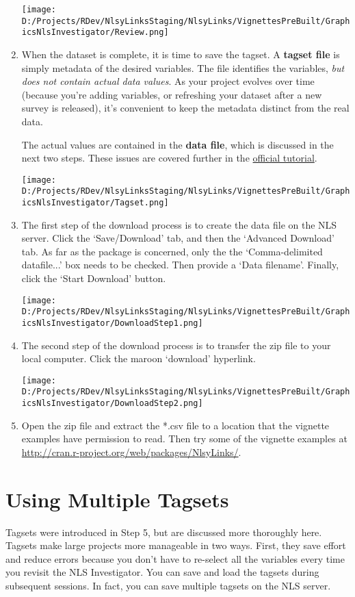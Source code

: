 \documentclass{article}\usepackage[]{graphicx}\usepackage[]{color}
\begin{document}
\begin{enumerate}
\texttt{[image: D:/Projects/RDev/NlsyLinksStaging/NlsyLinks/VignettesPreBuilt/GraphicsNlsInvestigator/Review.png]}

\item When the dataset is complete, it is time to save the tagset.  A \textbf{tagset file} is simply metadata of the desired variables.  The file identifies the variables, \emph{but does not contain actual data values}.  As your project evolves over time (because you're adding variables, or refreshing your dataset after a new survey is released), it's convenient to keep the metadata distinct from the real data.  

The actual values are contained in the \textbf{data file}, which is discussed in the next two steps.  These issues are covered further in the \href{http://www.nlsinfo.org/InvestigatorGuide/investigator_guide_TOC.html}{official tutorial}.

\texttt{[image: D:/Projects/RDev/NlsyLinksStaging/NlsyLinks/VignettesPreBuilt/GraphicsNlsInvestigator/Tagset.png]}

\item The first step of the download process is to create the data file on the NLS server.  Click the `Save/Download' tab, and then the `Advanced Download' tab.  As far as the  package is concerned, only the the `Comma-delimited datafile...' box needs to be checked.  Then provide a `Data filename'.  Finally, click the `Start Download' button.

\texttt{[image: D:/Projects/RDev/NlsyLinksStaging/NlsyLinks/VignettesPreBuilt/GraphicsNlsInvestigator/DownloadStep1.png]}

\item The second step of the download process is to transfer the zip file to your local computer.  Click the maroon `download' hyperlink.

\texttt{[image: D:/Projects/RDev/NlsyLinksStaging/NlsyLinks/VignettesPreBuilt/GraphicsNlsInvestigator/DownloadStep2.png]}

\item Open the zip file and extract the *.csv file to a location that the vignette examples have permission to read.  Then try some of the  vignette examples at \url{http://cran.r-project.org/web/packages/NlsyLinks/}. 

\end{enumerate}
\section{Using Multiple Tagsets}
Tagsets were introduced in Step 5, but are discussed more thoroughly here.  Tagsets make large projects more manageable in two ways.  First, they save effort and reduce errors because you don't have to re-select all the variables every time you revisit the NLS Investigator.  You can save and load the tagsets during subsequent sessions.  In fact, you can save multiple tagsets on the NLS server.
\end{document}
